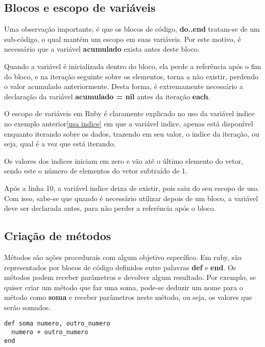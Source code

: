 \documentclass[12pt]{article}
\newcommand{\code}[1] {\textbf{#1}}
\begin{document}
\subsection{Blocos e escopo de variáveis}

Uma observação importante, é que os blocos de código, \code{do..end} tratam-se de um sub-código, o qual mantém um escopo em suas variáveis. Por este motivo, é necessário que a variável \code{acumulado} exista antes deste bloco. 

Quando a variável é inicializada dentro do bloco, ela perde a referência após o fim do bloco, e na iteração seguinte sobre os elementos, torna a não existir, perdendo o valor acumulado anteriormente. Desta forma, é extremamente necessário a declaração da variável \code{acumulado = nil} antes da iteração \code{each}.

O escopo de variáveis em Ruby é claramente explicado no uso da variável indice no exemplo anterior\ref{usa indice} em que a variável indice, apenas está disponível enquanto iterando sobre os dados, trazendo em seu valor, o indice da iteração, ou seja, qual é a vez que está iterando.

Os valores dos indices iniciam em zero e vão até o último elemento do vetor, sendo este o número de elementos do vetor subtraído de 1.

Após a linha 10, a variável indice deixa de existir, pois saiu do seu escopo de uso. Com isso, sabe-se que quando é necessário utilizar depois de um bloco, a variável deve ser declarada antes, para não perder a referência após o bloco.



\subsection{Criação de métodos}

Métodos são ações procedurais com algum objetivo específico. Em ruby, são representados por blocos de código definidos entre palavras \code{def} e \code{end}. Os métodos podem receber parâmetros e devolver algum resultado. Por exemplo, se quiser criar um método que faz uma soma, pode-se deduzir um nome para o método como \code{soma} e receber parâmetros neste método, ou seja, os valores que serão somados.

\begin{lstlisting}[caption=implementando um método de soma]
def soma numero, outro_numero
  numero + outro_numero
end
\end{lstlisting}
\end{document}
